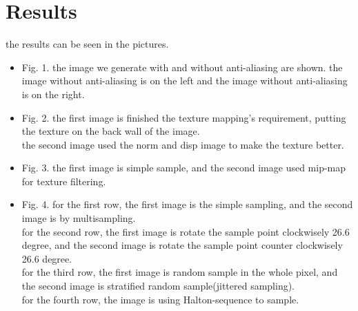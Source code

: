 \documentclass[acmtog]{acmart}
\begin{document}
\section{Results}
the results can be seen in the pictures.
\begin{itemize}
	\item Fig. 1. the image we generate with and without anti-aliasing are shown.
	the image without anti-aliasing is on the left and the  image without anti-aliasing is on the right.

	\item Fig. 2.
	the first image is finished the texture mapping's requirement, putting the texture on the back wall of the image.\\
	the second image used the norm and disp image to make the texture better.

	\item Fig. 3.
	the first image is simple sample, and the second image used mip-map for texture filtering.

	\item Fig. 4.
	for the first row, the first image is the simple sampling, and the second image is by multisampling.\\
	for the second row, the first image is rotate the sample point clockwisely 26.6 degree, and the second image is rotate the sample point counter clockwisely 26.6 degree.\\
	for the third row, the first image is random sample in the whole pixel, and the second image is stratified random sample(jittered sampling).\\
	for the fourth row, the image is using Halton-sequence to sample.\\

\end{itemize}
\end{document}
